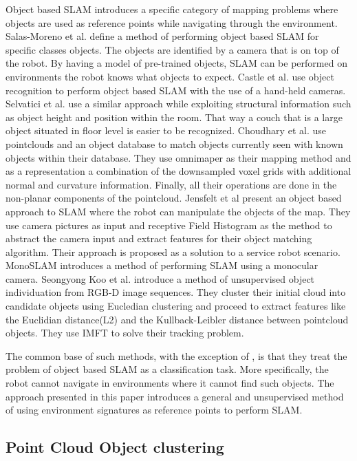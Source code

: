 \documentclass[twoside,hidelinks]{article}
\begin{document}
Object based SLAM introduces a specific category of mapping problems where objects are used as reference points while navigating through the environment.
Salas-Moreno et al.\cite{SLAM++} define a method of performing object based SLAM for specific classes objects. The objects are identified by a camera that is on top of the robot. By having a model of pre-trained objects, SLAM can be performed on environments the robot knows what objects to expect.
Castle et al. use object recognition to perform object based SLAM with the use of a hand-held cameras. Selvatici et al.\cite{objSLAM} use a similar approach while exploiting structural information such as object height and position within the room. That way a couch that is a large object situated in floor level is easier to be recognized.
Choudhary et al.\cite{objectpointSLAM} use pointclouds and an object database to match objects currently seen with known objects within their database. They use omnimaper\cite{omnimaper} as their mapping method and as a representation a combination of the downsampled  voxel grids with additional normal and curvature information.  Finally, all their operations are done in the non-planar components of the pointcloud.
Jensfelt et al\cite{objSLAM} present an object based approach to SLAM where the robot can manipulate the objects of the map. They use camera pictures as input and receptive Field Histogram as the method to abstract the camera input and extract features for their object matching algorithm. Their approach is proposed as a solution to a service robot scenario.
MonoSLAM\cite{monoSLAM} introduces a method of performing SLAM using a monocular camera. 
Seongyong Koo et al.\cite{objectDisc} introduce a method of unsupervised object individuation from RGB-D image sequences. They cluster their initial cloud into candidate objects using Eucledian clustering and proceed to extract features like the Euclidian distance(L2) and the Kullback-Leibler distance between pointcloud objects. They use IMFT to solve their tracking problem.

The common base of such methods, with the exception of \cite{objectDisc}, is that they treat the problem of object based SLAM as a classification task. More specifically, the robot cannot navigate in environments where it cannot find such objects.
The approach presented in this paper introduces a general and unsupervised method of using environment signatures as reference points to perform SLAM.

\subsection{Point Cloud Object clustering}
\end{document}
